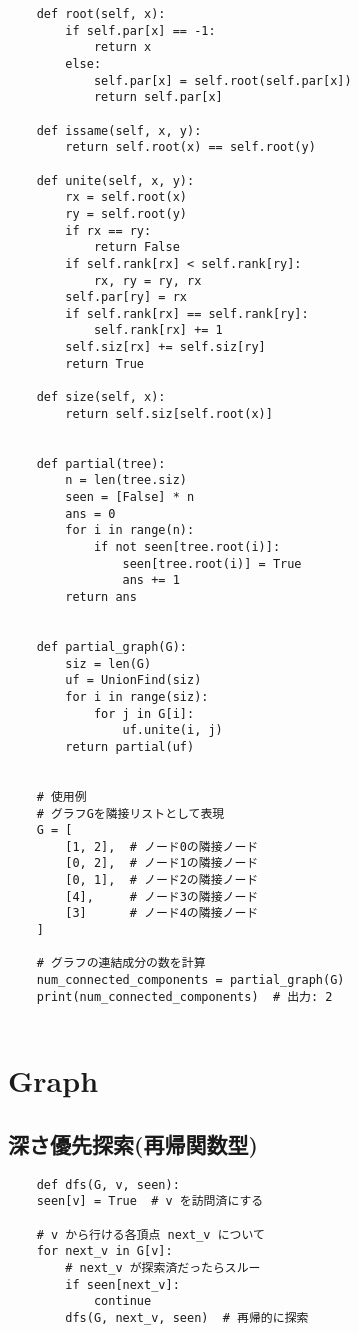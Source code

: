 \documentclass[a4paper, landscape, 9pt]{jarticle} %
\begin{document}
\begin{multicols*}{3}
\begin{lstlisting}
    def root(self, x):
        if self.par[x] == -1:
            return x
        else:
            self.par[x] = self.root(self.par[x])
            return self.par[x]

    def issame(self, x, y):
        return self.root(x) == self.root(y)

    def unite(self, x, y):
        rx = self.root(x)
        ry = self.root(y)
        if rx == ry:
            return False
        if self.rank[rx] < self.rank[ry]:
            rx, ry = ry, rx
        self.par[ry] = rx
        if self.rank[rx] == self.rank[ry]:
            self.rank[rx] += 1
        self.siz[rx] += self.siz[ry]
        return True

    def size(self, x):
        return self.siz[self.root(x)]


    def partial(tree):
        n = len(tree.siz)
        seen = [False] * n
        ans = 0
        for i in range(n):
            if not seen[tree.root(i)]:
                seen[tree.root(i)] = True
                ans += 1
        return ans


    def partial_graph(G):
        siz = len(G)
        uf = UnionFind(siz)
        for i in range(siz):
            for j in G[i]:
                uf.unite(i, j)
        return partial(uf)


    # 使用例
    # グラフGを隣接リストとして表現
    G = [
        [1, 2],  # ノード0の隣接ノード
        [0, 2],  # ノード1の隣接ノード
        [0, 1],  # ノード2の隣接ノード
        [4],     # ノード3の隣接ノード
        [3]      # ノード4の隣接ノード
    ]

    # グラフの連結成分の数を計算
    num_connected_components = partial_graph(G)
    print(num_connected_components)  # 出力: 2
        
    \end{lstlisting}

    \section{Graph}
    \subsection{深さ優先探索(再帰関数型)}
    \begin{lstlisting}
    def dfs(G, v, seen):
    seen[v] = True  # v を訪問済にする
    
    # v から行ける各頂点 next_v について
    for next_v in G[v]:
        # next_v が探索済だったらスルー
        if seen[next_v]:
            continue
        dfs(G, next_v, seen)  # 再帰的に探索
    

\end{lstlisting}
\end{multicols*}
\end{document}
